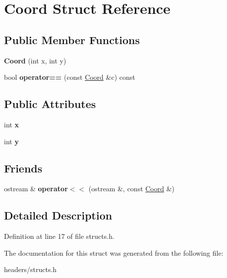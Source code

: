 \hypertarget{structCoord}{\section{Coord Struct Reference}
\label{structCoord}
}
\subsection*{Public Member Functions}
\begin{DoxyCompactItemize}
\item 
\hypertarget{structCoord_a31640ee494a7c77331cc56de54894301}{{\bfseries Coord} (int x, int y)}\label{structCoord_a31640ee494a7c77331cc56de54894301}

\item 
\hypertarget{structCoord_abb0834bf89a754b762ee1ef476d5d8ec}{bool {\bfseries operator==} (const \hyperlink{structCoord}{Coord} \&c) const }\label{structCoord_abb0834bf89a754b762ee1ef476d5d8ec}

\end{DoxyCompactItemize}
\subsection*{Public Attributes}
\begin{DoxyCompactItemize}
\item 
\hypertarget{structCoord_a696eaa744360fc791d0e3b331c549dbe}{int {\bfseries x}}\label{structCoord_a696eaa744360fc791d0e3b331c549dbe}

\item 
\hypertarget{structCoord_a214166cca70cef7dda9201689c3e81ab}{int {\bfseries y}}\label{structCoord_a214166cca70cef7dda9201689c3e81ab}

\end{DoxyCompactItemize}
\subsection*{Friends}
\begin{DoxyCompactItemize}
\item 
\hypertarget{structCoord_a3336e09424c5c7145f570643d05e0c44}{ostream \& {\bfseries operator$<$$<$} (ostream \&, const \hyperlink{structCoord}{Coord} \&)}\label{structCoord_a3336e09424c5c7145f570643d05e0c44}

\end{DoxyCompactItemize}


\subsection{Detailed Description}


Definition at line 17 of file structs.\+h.



The documentation for this struct was generated from the following file\+:\begin{DoxyCompactItemize}
\item 
headers/structs.\+h\end{DoxyCompactItemize}
